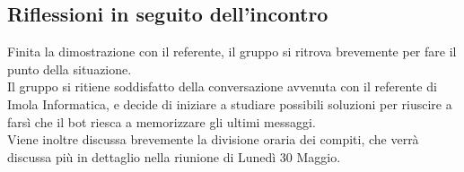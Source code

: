 \subsection{Riflessioni in seguito dell'incontro}
  Finita la dimostrazione con il referente, il gruppo si ritrova brevemente per fare il punto della situazione. \\
  Il gruppo si ritiene soddisfatto della conversazione avvenuta con il referente di Imola Informatica, e decide di iniziare a studiare possibili soluzioni per riuscire a farsì
  che il bot riesca a memorizzare gli ultimi messaggi. \\
  Viene inoltre discussa brevemente la divisione oraria dei compiti, che verrà discussa più in dettaglio nella riunione di Lunedì 30 Maggio.